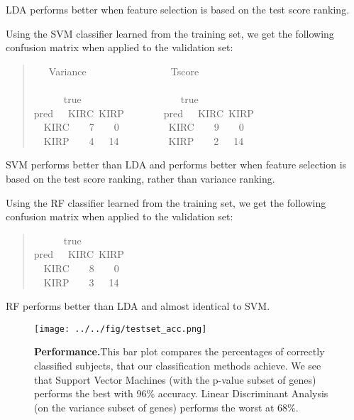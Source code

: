 LDA performs better when feature selection is based on the test score ranking.

Using the SVM classifier learned from the training set, we get the following
confusion matrix when applied to the validation set:

\begin{quote}{ \ttfamily \raggedright \noindent
\centering
~~~Variance~~~~~~~~~~~~~~~~~Tscore\\
~\\
~~~~~~true~~~~~~~~~~~~~~~~~~~~true\\
pred~~~KIRC~KIRP~~~~~~~~pred~~~KIRC~KIRP\\
~~KIRC~~~~7~~~~0~~~~~~~~~~KIRC~~~~9~~~~0\\
~~KIRP~~~~4~~~14~~~~~~~~~~KIRP~~~~2~~~14\\
}
\end{quote}

SVM performs better than LDA and performs better when feature selection is
based on the test score ranking, rather than variance ranking.

Using the RF classifier learned from the training set, we get the following
confusion matrix when applied to the validation set:

\begin{quote}{ \ttfamily \raggedright \noindent
\centering
~~~~~~true\\
pred~~~KIRC~KIRP\\
~~KIRC~~~~8~~~~0\\
~~KIRP~~~~3~~~14\\
}
\end{quote}

RF performs better than LDA and almost identical to SVM.

\begin{figure}[H]
  \centering
    \texttt{[image: ../../fig/testset\_acc.png]}
\caption{\textbf{Performance.}This bar plot compares the percentages of correctly
  classified subjects, that our classification methods achieve. We see that
  Support Vector Machines (with the p-value subset of genes) performs the best
  with 96\% accuracy. Linear Discriminant Analysis (on the variance subset of
  genes) performs the worst at 68\%.}
   \label{fig:performance}
\end{figure}

